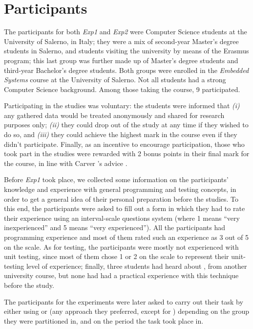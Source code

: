 \section{Participants}
The participants for both \textit{Exp1} and \textit{Exp2} were Computer Science students at the University of Salerno, in Italy; they were a mix of second-year Master's degree students in Salerno, and students visiting the university by means of the Erasmus program; this last group was further made up of Master's degree students and third-year Bachelor's degree students. Both groups were enrolled in the \textit{Embedded Systems} course at the University of Salerno. Not all students had a strong Computer Science background. Among those taking the course, 9 participated. 

Participating in the studies was voluntary: the students were informed that \textit{(i)} any gathered data would be treated anonymously and shared for research purposes only; \textit{(ii)} they could drop out of the study at any time if they wished to do so, and \textit{(iii)} they could achieve the highest mark in the course even if they didn't participate. Finally, as an incentive to encourage participation, those who took part in the studies were rewarded with 2 bonus points in their final mark for the course, in line with Carver \etal's advice \cite{DBLP:conf/metrics/CarverJMS03}.

Before \textit{Exp1} took place, we collected some information on the participants' knowledge and experience with general programming and testing concepts, in order to get a general idea of their personal preparation before the studies. To this end, the participants were asked to fill out a form in which they had to rate their experience using an interval-scale questions system (where 1 means “very inexperienced” and 5 means “very experienced”). All the participants had programming experience and most of them rated such an experience as 3 out of 5 on the scale. 
As for testing, the participants were mostly not experienced with unit testing, since most of them chose 1 or 2 on the scale to represent their unit-testing level of experience; finally, three students had heard about \tdd, from another university course, but none had had a practical experience with this technique before the study.

The participants for the experiments were later asked to carry out their task by either using \tdd or \notdd (\ie any approach they preferred, except for \tdd) depending on the group they were partitioned in, and on the period the task took place in. 





